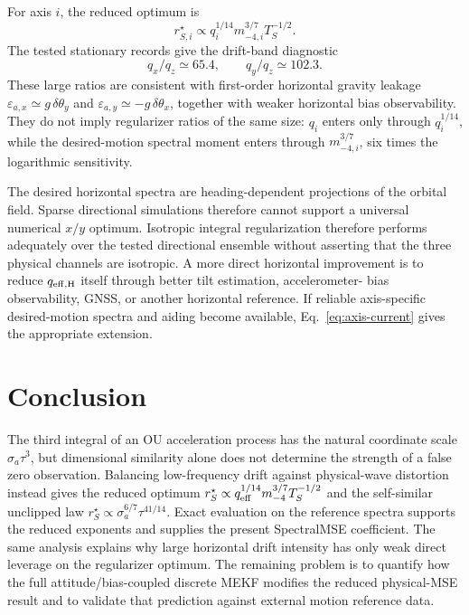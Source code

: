 \documentclass[conference]{IEEEtran}
\theoremstyle{remark}
\begin{document}
For axis $i$, the reduced optimum is
\begin{equation}
 r_{S,i}^\star\propto
 q_i^{1/14}m_{-4,i}^{3/7}T_S^{-1/2}.
 \label{eq:axis-current}
\end{equation}
The tested stationary records give the drift-band diagnostic
\begin{equation}
 \boxed{q_x/q_z\simeq65.4,\qquad q_y/q_z\simeq102.3.}
 \label{eq:q-horizontal-ratios}
\end{equation}
These large ratios are consistent with first-order horizontal gravity leakage
$\varepsilon_{a,x}\simeq g\,\delta\theta_y$ and
$\varepsilon_{a,y}\simeq-g\,\delta\theta_x$, together with weaker horizontal
bias observability.  They do not imply regularizer ratios of the same size:
$q_i$ enters only through $q_i^{1/14}$, while the desired-motion spectral moment
enters through $m_{-4,i}^{3/7}$, six times the logarithmic sensitivity.

The desired horizontal spectra are heading-dependent projections of the orbital
field.  Sparse directional simulations therefore cannot support a universal
numerical $x/y$ optimum.  Isotropic integral regularization therefore performs
adequately over the tested directional ensemble without asserting that the
three physical channels are isotropic.  A more direct horizontal improvement is
to reduce $q_{\rm eff,H}$ itself through better tilt estimation, accelerometer-
bias observability, GNSS, or another horizontal reference.  If reliable
axis-specific desired-motion spectra and aiding become available,
Eq.~\eqref{eq:axis-current} gives the appropriate extension.

\section{Conclusion}

The third integral of an OU acceleration process has the natural coordinate
scale $\sigma_a\tau^3$, but dimensional similarity alone does not determine the
strength of a false zero observation.  Balancing low-frequency drift against
physical-wave distortion instead gives the reduced optimum
$r_S^\star\propto q_{\rm eff}^{1/14}m_{-4}^{3/7}T_S^{-1/2}$ and the
self-similar unclipped law
$r_S^\star\propto\sigma_a^{6/7}\tau^{41/14}$.  Exact evaluation on the
reference spectra supports the reduced exponents and supplies the present
SpectralMSE coefficient.  The same analysis explains why large horizontal
drift intensity has only weak direct leverage on the regularizer optimum.  The
remaining problem is to quantify how the full attitude/bias-coupled discrete
MEKF modifies the reduced physical-MSE result and to validate that prediction
against external motion reference data.



\end{document}
